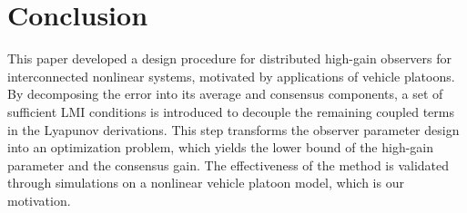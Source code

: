\documentclass{ifacconf}
\begin{document}
\section{Conclusion}\label{sec:conclusion}
\vspace*{-0.3cm}
This paper developed a design procedure for distributed high-gain observers for interconnected nonlinear systems, motivated by applications of vehicle platoons. By decomposing the error into its average and consensus components, a set of sufficient LMI conditions is introduced to decouple the remaining coupled terms in the Lyapunov derivations. This step transforms the observer parameter design into an optimization problem, which yields the lower bound of the high-gain parameter and the consensus gain. The effectiveness of the method is validated through simulations on a nonlinear vehicle platoon model, which is our motivation.

















\vspace*{-0.3cm}
\appendix
\end{document}
